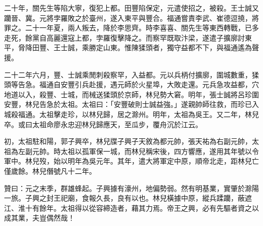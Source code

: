 二十年，關先生等陷大寧，復犯上都。田豐陷保定，元遣使招之，被殺。王士誠又躪晉、冀。元將孛羅敗之於臺州，遂入東平與豐合。福通嘗責李武、崔德逗撓，將罪之。二十一年夏，兩人叛去，降於李思齊。時李喜喜、關先生等東西轉戰，已多走死，餘黨自高麗還寇上都，孛羅復擊降之。而察罕既取汴梁，遂遣子擴廓討東平，脅降田豐、王士誠，乘勝定山東。惟陳猱頭者，獨守益都不下，與福通遙為聲援。

二十二年六月，豐、士誠乘閒刺殺察罕，入益都。元以兵柄付擴廓，圍城數重，猱頭等告急。福通自安豐引兵赴援，遇元師於火星埠，大敗走還。元兵急攻益都，穴地道以入，殺豐、士城，而械送猱頭於京師，林兒勢大窘。明年，張士誠將呂珍圍安豐，林兒告急於太祖。太祖曰：「安豐破則士誠益強。」遂親帥師往救，而珍已入城殺福通。太祖擊走珍，以林兒歸，居之滁州。明年，太祖為吳王。又二年，林兒卒。或曰太祖命廖永忠迎林兒歸應天，至瓜步，覆舟沉於江云。

初，太祖駐和陽，郭子興卒，林兒牒子興子天敘為都元帥，張天祐為右副元帥，太祖為左副元帥。時太祖以孤軍保一城，而林兒稱宋後，四方響應，遂用其年號以令軍中。林兒歿，始以明年為吳元年。其年，遣大將軍定中原，順帝北走，距林兒亡僅歲餘。林兒僭號凡十二年。

贊曰：元之末季，群雄蜂起。子興據有濠州，地偏勢弱。然有明基業，實肇於滁陽一旅。子興之封王祀廟，食報久長，良有以也。林兒橫據中原，縱兵蹂躪，蔽遮江、淮十有餘年。太祖得以從容締造者，藉其力焉。帝王之興，必有先驅者資之以成其業，夫豈偶然哉！
